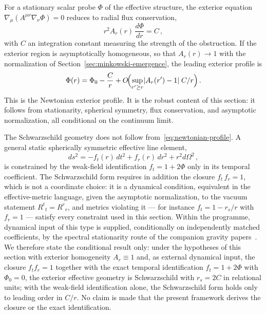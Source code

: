\documentclass[epj]{svjour}
\begin{document}
  For a stationary scalar probe $\Phi$ of the effective structure, the exterior equation
  $\nabla_\mu (A^{\mu\nu}\nabla_\nu \Phi) = 0$ reduces to radial flux conservation,
  \begin{equation}
    r^{2} A_r(r)\, \frac{d\Phi}{dr} = C\,,
    \label{eq:flux-conservation}
  \end{equation}
  with $C$ an integration constant measuring the strength of the obstruction.
  If the exterior region is asymptotically homogeneous, so that $A_r(r) \to 1$ with the
  normalization of Section~\ref{sec:minkowski-emergence}, the leading exterior profile is
  \begin{equation}
    \Phi(r) = \Phi_0 - \frac{C}{r}
    + O\!\Bigl(\sup_{r' \ge r}\lvert A_r(r') - 1\rvert \; C/r\Bigr)\,.
    \label{eq:newtonian-profile}
  \end{equation}
  This is the Newtonian exterior profile.
  It is the robust content of this section: it follows from stationarity, spherical symmetry, flux
  conservation, and asymptotic normalization, all conditional on the continuum limit.

  The Schwarzschild geometry does not follow from~\eqref{eq:newtonian-profile}.
  A general static spherically symmetric effective line element,
  \begin{equation}
    ds^{2}
    = - f_t(r)\, dt^{2}
    + f_r(r)\, dr^{2}
    + r^{2} d\Omega^{2}\,,
    \label{eq:static-metric}
  \end{equation}
  is constrained by the weak-field identification $f_t = 1 + 2\Phi$ only in its temporal
  coefficient.
  The Schwarzschild form requires in addition the closure $f_t\, f_r = 1$, which is not a
  coordinate choice: it is a dynamical condition, equivalent in the effective-metric language,
  given the asymptotic normalization, to
  the vacuum statement $R^{t}{}_{t} = R^{r}{}_{r}$, and metrics violating it --- for instance
  $f_t = 1 - r_s/r$ with $f_r = 1$ --- satisfy every constraint used in this section.
  Within the programme, dynamical input of this type is supplied, conditionally on independently
  matched coefficients, by the spectral stationarity route of the companion gravity
  papers~\cite{Beau2026h,Beau2026thermo}.
  We therefore state the conditional result only:
  under the hypotheses of this section with exterior homogeneity $A_r \equiv 1$ and, as external
  dynamical input, the closure
  $f_t f_r = 1$ together with the exact temporal identification $f_t = 1 + 2\Phi$ with
  $\Phi_0 = 0$, the exterior effective geometry is Schwarzschild with $r_s = 2C$ in relational
  units; with the weak-field identification alone, the Schwarzschild form holds only to leading
  order in $C/r$.
  No claim is made that the present framework derives the closure or the exact identification.
\end{document}
